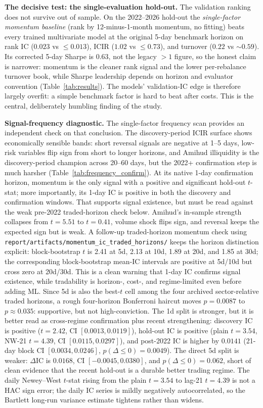 \documentclass[9pt]{extarticle}
\begin{document}
\textbf{The decisive test: the single-evaluation hold-out.} The validation ranking does
not survive out of sample. On the 2022--2026 hold-out the \emph{single-factor
momentum baseline} (rank by 12-minus-1-month momentum, no fitting) beats every
trained multivariate model at the original 5-day benchmark horizon on rank IC
($0.023$ vs $\le 0.013$), ICIR ($1.02$ vs $\le 0.73$), and turnover
($0.22$ vs $\sim 0.59$). Its corrected 5-day Sharpe is $0.63$, not the
legacy $>1$ figure, so the honest claim is narrower: momentum is the cleaner
rank signal and the lower per-rebalance turnover book, while Sharpe leadership
depends on horizon and evaluator convention (Table~\ref{tab:results}). The
models' validation-IC edge is therefore largely overfit: a simple benchmark
factor is hard to beat after costs. This is the central, deliberately humbling
finding of the study.

\textbf{Signal-frequency diagnostic.} The single-factor frequency scan provides
an independent check on that conclusion. The discovery-period ICIR surface
shows economically sensible bands: short reversal signals are negative at
1--5 days, low-risk variables flip sign from short to longer horizons, and
Amihud illiquidity is the discovery-period champion across 20--60 days, but the
2022+ confirmation step is much harsher (Table~\ref{tab:frequency_confirm}).
At its native 1-day confirmation horizon, momentum is the only signal with a
positive and significant hold-out $t$-stat; more importantly, its 1-day IC is
positive in both the discovery and confirmation windows. That supports signal
existence, but must be read against the weak pre-2022 traded-horizon check below.
Amihud's in-sample
strength collapses from $t=5.51$ to $t=0.41$, volume shock flips sign, and
reversal keeps the expected sign but is weak. A follow-up traded-horizon
momentum check using \texttt{report/artifacts/momentum\_ic\_traded\_horizons/}
keeps the horizon distinction explicit: block-bootstrap $t$ is 2.41 at 5d, 2.13 at
10d, 1.89 at 20d, and 1.85 at 30d; the corresponding block-bootstrap mean-IC
intervals are positive at 5d/10d but cross zero at 20d/30d. This is a clean
warning that 1-day IC confirms signal existence, while tradability is
horizon-, cost-, and regime-limited even before adding ML. Since 5d is also the
best-$t$ cell among the four archived sector-relative traded horizons, a rough
four-horizon Bonferroni haircut moves $p=0.0087$ to $p\approx0.035$:
supportive, but not high-conviction. The 1d split is stronger, but it is better
read as cross-regime confirmation plus recent strengthening: discovery IC is
positive ($t=2.42$, CI $[0.0013,0.0119]$), hold-out IC is positive (plain
$t=3.54$, NW-21 $t=4.39$, CI $[0.0115,0.0297]$), and post-2022 IC is higher by
$0.0141$ (21-day block CI $[0.0034,0.0246]$, $p(\Delta\le0)=0.0049$).
The direct 5d split is weaker: $\Delta$IC is $0.0168$, CI
$[-0.0045,0.0380]$, and $p(\Delta\le0)=0.062$, short of clean evidence that the
recent hold-out is a durable better trading regime. The daily Newey--West
$t$-stat rising from the plain $t=3.54$ to lag-21 $t=4.39$ is not a HAC
sign error; the daily IC series is mildly negatively autocorrelated, so the
Bartlett long-run variance estimate tightens rather than widens.
\end{document}
